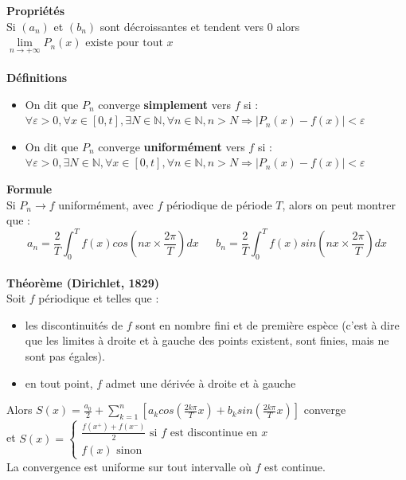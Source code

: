 \documentclass[a4paper,10pt]{report}
\begin{document}
\noindent \textbf{Propriétés}\\
Si $(a_n)$ et $(b_n)$ sont décroissantes et tendent vers 0 alors $\lim \limits_{n\longrightarrow +\infty}P_n(x) \text{ existe pour tout }x$
\\ \\
\noindent \textbf{Définitions}
\begin{itemize}
\item On dit que $P_n$ converge \textbf{simplement} vers $f$ si :\\
$\forall \varepsilon > 0, \forall x \in [0,t], \exists N \in \mathbb{N}, \forall n \in \mathbb{N}, n>N \Rightarrow |P_n(x)-f(x)|<\varepsilon$
\item On dit que $P_n$ converge \textbf{uniformément} vers $f$ si :\\
$\forall \varepsilon > 0, \exists N \in \mathbb{N}, \forall x \in [0,t], \forall n \in \mathbb{N}, n>N \Rightarrow |P_n(x)-f(x)|<\varepsilon$
\end{itemize}

\noindent \textbf{Formule}\\
Si $P_n \longrightarrow f$ uniformément, avec $f$ périodique de période $T$, alors on peut montrer que :\\
\abovedisplayskip=0mm
\begin{displaymath}
a_n = \frac{2}{T} \int_0^{T} f(x)cos\left(nx \times \frac{2\pi}{T}\right)dx \ \ \ \ \ \ \ b_n = \frac{2}{T} \int_0^{T} f(x)sin\left(nx \times \frac{2\pi}{T}\right)dx 
\end{displaymath}
\\
\noindent \textbf{Théorème (Dirichlet, 1829)}\\
Soit $f$ périodique et telles que :
\begin{itemize}
\item les discontinuités de $f$ sont en nombre fini et de première espèce (c'est à dire que les limites à droite et à gauche des points existent, sont finies, mais ne sont pas égales).
\item en tout point, $f$ admet une dérivée à droite et à gauche
\end{itemize}
Alors $S(x)=\frac{a_0}{2} + \sum \limits_{k=1}^n \left[ a_k cos\left(\frac{2k\pi}{T}x\right) + b_k sin\left(\frac{2k\pi}{T}x\right) \right]$ converge \\
et $S(x) = \left\lbrace
\begin{array}{l}
\frac{f(x^+)+f(x^-)}{2} \text{ si }f\text{ est discontinue en }x  \\
f(x) \text{ sinon}
\end{array}\right.$ \\
La convergence est uniforme sur tout intervalle où $f$ est continue.
\end{document}
